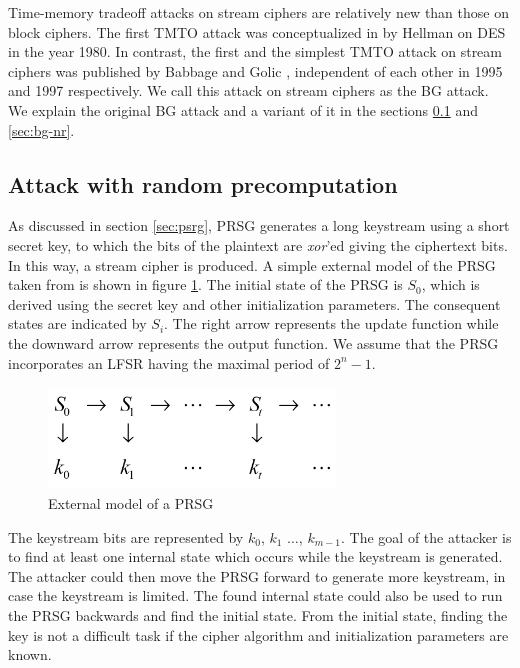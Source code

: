 Time-memory tradeoff attacks on stream ciphers are relatively new than those on block ciphers. The first TMTO attack was conceptualized in \cite{hellman1980ctm} by Hellman on DES in the year 1980. In contrast, the first and the simplest TMTO attack on stream ciphers was published by Babbage \cite{babbage} and Golic \cite{golic}, independent of each other in 1995 and 1997 respectively. We call this attack on stream ciphers as the BG attack. We explain the original BG attack and a variant of it in the sections \ref{sec:bg-r} and \ref{sec:bg-nr}.

\subsection{Attack with random precomputation}
\label{sec:bg-r}

As discussed in section \ref{sec:psrg}, PRSG generates a long keystream using a short secret key, to which the bits of the plaintext are \emph{xor}'ed giving the ciphertext bits. In this way, a stream cipher is produced. A simple external model of the PRSG taken from \cite{babbage} is shown in figure \ref{fig:psrg-model}. The initial state of the PRSG is $S_0$, which is derived using the secret key and other initialization parameters. The consequent states are indicated by $S_i$. The right arrow represents the update function while the downward arrow represents the output function. We assume that the PRSG incorporates an LFSR having the maximal period of $2^{n} - 1$.

\begin{figure}[h]
	\centering
	\includegraphics[width=3in]{./figures/prsgmodel.png}
	\caption{External model of a PRSG}	
	\label{fig:psrg-model}
\end{figure}

The keystream bits are represented by $k_0$, $k_1$ $\ldots$, $k_{m-1}$. The goal of the attacker is to find at least one internal state which occurs while the keystream is generated. The attacker could then move the PRSG forward to generate more keystream, in case the keystream is limited. The found internal state could also be used to run the PRSG backwards and find the initial state. From the initial state, finding the key is not a difficult task if the cipher algorithm and initialization parameters are known.\\

